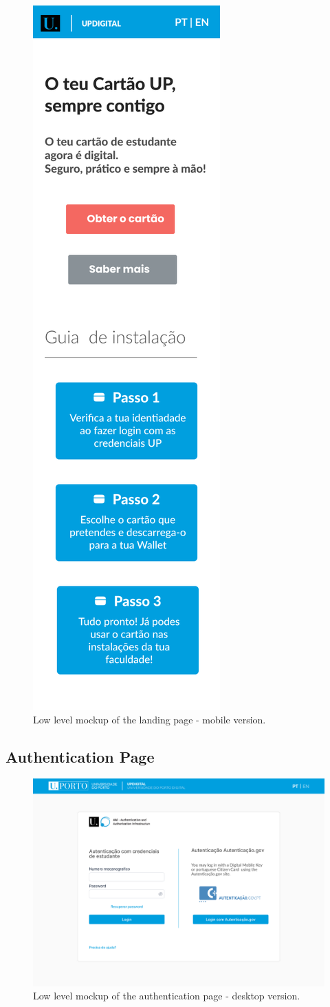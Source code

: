 \documentclass[10pt]{article}
\begin{document}
\begin{figure}[H]
  \centering
  \includegraphics[width=0.25\linewidth]{report-images/landing-page-mobile.png}
  \caption{Low level mockup of the landing page - mobile version.}
  \label{fig:fig-3}
\end{figure}

\clearpage %

\subsection{Authentication Page}

\begin{figure}[H]
  \centering
  \includegraphics[width=1\linewidth]{report-images/authentication-page-desktop.png}
  \caption{Low level mockup of the authentication page - desktop version.}
  \label{fig:fig-4}
\end{figure}
\end{document}
